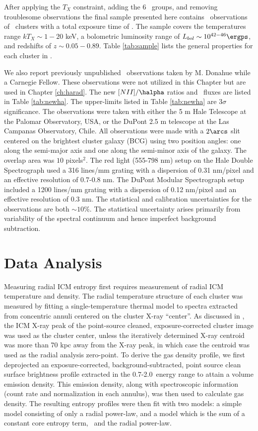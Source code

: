 After applying the $T_X$ constraint, adding the 6 \hifl\ groups, and
removing troublesome observations the final sample presented here
contains \entsuppobs\ observations of \entsuppnum\ clusters with a total
exposure time of \expt. The sample covers the temperatures range $kT_X
\sim 1-20$ keV, a bolometric luminosity range of $L_{bol} \sim
10^{42-46} \ergps$, and redshifts of $z \sim 0.05-0.89$. Table
\ref{tab:sample} lists the general properties for each cluster in
\accept.

We also report previously unpublished \halpha\ observations taken by
M. Donahue while a Carnegie Fellow. These observations were not
utilized in this Chapter but are used in Chapter \ref{ch:harad}. The
new $[NII]/\halpha$ ratios and \halpha\ fluxes are listed in Table
\ref{tab:newha}. The upper-limits listed in Table \ref{tab:newha} are
$3\sigma$ significance. The observations were taken with either the 5
m Hale Telescope at the Palomar Observatory, USA, or the DuPont 2.5 m
telescope at the Las Campanas Observatory, Chile. All observations
were made with a $2\arcs$ slit centered on the brightest cluster
galaxy (BCG) using two position angles: one along the semi-major axis
and one along the semi-minor axis of the galaxy. The overlap area was
$10$ pixels$^2$. The red light (555-798 nm) setup on the Hale Double
Spectrograph used a 316 lines/mm grating with a dispersion of 0.31
nm/pixel and an effective resolution of 0.7-0.8 nm. The DuPont Modular
Spectrograph setup included a 1200 lines/mm grating with a dispersion
of 0.12 nm/pixel and an effective resolution of 0.3 nm. The
statistical and calibration uncertainties for the observations are
both $\sim 10\%$. The statistical uncertainty arises primarily from
variability of the spectral continuum and hence imperfect background
subtraction.

\section{Data Analysis}
\label{sec:entsuppdata}

Measuring radial ICM entropy first requires measurement of radial ICM
temperature and density. The radial temperature structure of each
cluster was measured by fitting a single-temperature thermal model to
spectra extracted from concentric annuli centered on the cluster X-ray
``center''. As discussed in \citet{xrayband}, the ICM X-ray peak of
the point-source cleaned, exposure-corrected cluster image was used as
the cluster center, unless the iteratively determined X-ray centroid
was more than 70 kpc away from the X-ray peak, in which case the
centroid was used as the radial analysis zero-point. To derive the gas
density profile, we first deprojected an exposure-corrected,
background-subtracted, point source clean surface brightness profile
extracted in the 0.7-2.0\keV\ energy range to attain a volume emission
density. This emission density, along with spectroscopic information
(count rate and normalization in each annulus), was then used to
calculate gas density. The resulting entropy profiles were then fit
with two models: a simple model consisting of only a radial power-law,
and a model which is the sum of a constant core entropy term, \kna\,
and the radial power-law.

